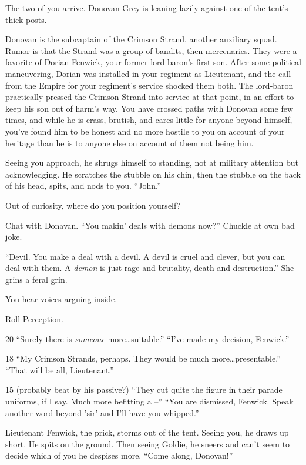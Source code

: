 \begin{multicols}{2}
The two of you arrive.
Donovan Grey is leaning lazily against one of the tent's thick posts.

Donovan is the subcaptain of the Crimson Strand, another auxiliary squad.
Rumor is that the Strand was a group of bandits, then mercenaries.
They were a favorite of Dorian Fenwick, your former lord-baron's first-son.
After some political maneuvering, Dorian was installed in your regiment as Lieutenant,
  and the call from the Empire for your regiment's service shocked them both.
The lord-baron practically pressed the Crimson Strand into service at that point, in an effort to
  keep his son out of harm's way.
You have crossed paths with Donovan some few times, and while he is crass, brutish, and
  cares little for anyone beyond himself, you've found him to be honest and no more hostile to you
  on account of your heritage than he is to anyone else on account of them not being him.

Seeing you approach, he shrugs himself to standing, not at military attention but acknowledging.
He scratches the stubble on his chin, then the stubble on the back of his head, spits,
  and nods to you.
``John.''

Out of curiosity, where do you position yourself?

Chat with Donavan.
``You makin' deals with demons now?''
Chuckle at own bad joke.

``Devil.
  You make a deal with a devil.
  A devil is cruel and clever, but you can deal with them.
  A \emph{demon} is just rage and brutality, death and destruction.''
She grins a feral grin.

You hear voices arguing inside.

Roll Perception.

20
``Surely there is \emph{someone} more\dots suitable.''
``I've made my decision, Fenwick.''

18
``My Crimson Strands, perhaps.
  They would be much more\dots presentable.''
``That will be all, Lieutenant.''

15 (probably beat by his passive?)
``They cut quite the figure in their parade uniforms, if I say.
  Much more befitting a --''
``You are dismissed, Fenwick.
  Speak another word beyond 'sir' and I'll have you whipped.''

Lieutenant Fenwick, the prick, storms out of the tent.
Seeing you, he draws up short.
He spits on the ground.
Then seeing Goldie, he sneers and can't seem to decide which of you he despises more.
``Come along, Donovan!''


\end{multicols}
